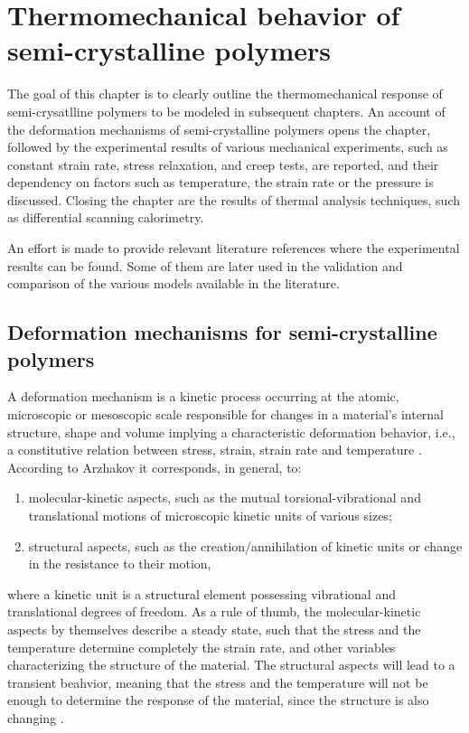 \chapter{Thermomechanical behavior of semi-crystalline polymers} \label{ch:thermomechanical_behavior_semi_crystalline_polymer}

The goal of this chapter is to clearly outline the thermomechanical response of semi-crysatlline polymers to be modeled in subsequent chapters.
An account of the deformation mechanisms of semi-crystalline polymers opens the chapter, followed by the experimental results of various mechanical experiments, such as constant strain rate, stress relaxation, and creep tests, are reported, and their dependency on factors such as temperature, the strain rate or the pressure is discussed.
Closing the chapter are the results of thermal analysis techniques, such as differential scanning calorimetry.

An effort is made to provide relevant literature references where the experimental results can be found.
Some of them are later used in the validation and comparison of the various models available in the literature.

\section{Deformation mechanisms for semi-crystalline polymers}
A deformation mechanism is a kinetic process occurring at the atomic, microscopic or mesoscopic scale responsible for changes in a material's internal structure, shape and volume implying a characteristic deformation behavior, i.e., a constitutive relation between stress, strain, strain rate and temperature \citep{frostDeformationmechanismMapsPlasticity1982}.
According to Arzhakov \citep{arzhakovRelaxationPhysicalMechanical2019}  it corresponds, in general, to:
\begin{enumerate}
	\item molecular-kinetic aspects, such as the mutual torsional-vibrational and translational motions of microscopic kinetic units of various sizes;
	\item structural aspects, such as the creation/annihilation of kinetic units or change in the resistance to their motion,
\end{enumerate}
where a kinetic unit is a structural element possessing vibrational and translational degrees of freedom.
As a rule of thumb, the molecular-kinetic aspects by themselves describe a steady state, such that the stress and the temperature determine completely the strain rate, and other variables characterizing the structure of the material.
The structural aspects will lead to a transient beahvior, meaning that the stress and the temperature will not be enough to determine the response of the material, since the structure is also changing \citep{frostDeformationmechanismMapsPlasticity1982}.

